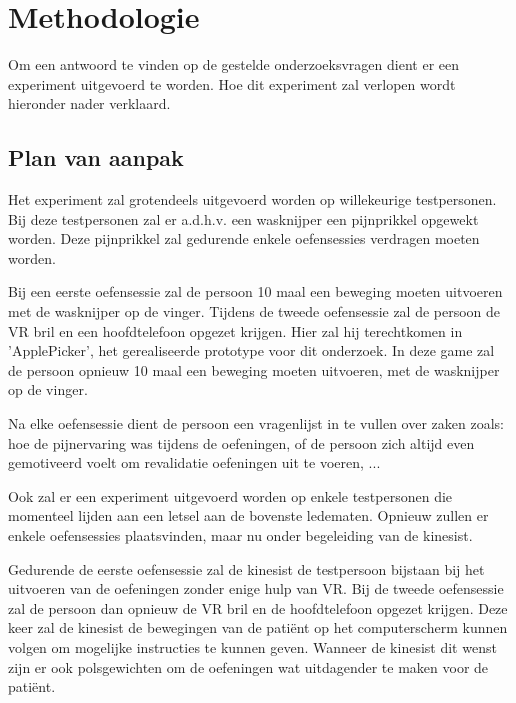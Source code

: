 
\chapter{Methodologie}
\label{ch:methodologie}


Om een antwoord te vinden op de gestelde onderzoeksvragen dient er een experiment uitgevoerd te worden. Hoe dit experiment zal verlopen wordt hieronder nader verklaard.

\section{Plan van aanpak}

Het experiment zal grotendeels uitgevoerd worden op willekeurige testpersonen. Bij deze testpersonen zal er a.d.h.v. een wasknijper een pijnprikkel opgewekt worden. Deze pijnprikkel zal gedurende enkele oefensessies verdragen moeten worden.

Bij een eerste oefensessie zal de persoon 10 maal een beweging moeten uitvoeren met de wasknijper op de vinger. 
Tijdens de tweede oefensessie zal de persoon de VR bril en een hoofdtelefoon opgezet krijgen. Hier zal hij terechtkomen in 'ApplePicker', het gerealiseerde prototype voor dit onderzoek. In deze game zal de persoon opnieuw 10 maal een beweging moeten uitvoeren, met de wasknijper op de vinger.

Na elke oefensessie dient de persoon een vragenlijst in te vullen 
over zaken zoals: hoe de pijnervaring was tijdens de oefeningen, of de persoon zich altijd even gemotiveerd voelt om revalidatie oefeningen uit te voeren, ...

Ook zal er een experiment uitgevoerd worden op enkele testpersonen die momenteel lijden aan een letsel aan de bovenste ledematen. Opnieuw zullen er enkele oefensessies plaatsvinden, maar nu onder begeleiding van de kinesist.

Gedurende de eerste oefensessie zal de kinesist de testpersoon bijstaan bij het uitvoeren van de oefeningen zonder enige hulp van VR.
Bij de tweede oefensessie zal de persoon dan opnieuw de VR bril en de hoofdtelefoon opgezet krijgen. Deze keer zal de kinesist de bewegingen van de patiënt op het computerscherm kunnen volgen om mogelijke instructies te kunnen geven. Wanneer de kinesist dit wenst zijn er ook polsgewichten om de oefeningen wat uitdagender te maken voor de patiënt.

